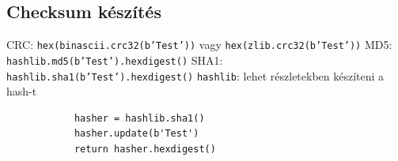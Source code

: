 \documentclass[12pt,a4paper]{article}
\begin{document}
\pagebreak

\subsection{Checksum készítés}

\begin{outline}
	\1 CRC: \texttt{hex(binascii.crc32(b'Test'))} vagy \texttt{hex(zlib.crc32(b'Test'))}
	\1 MD5: \texttt{hashlib.md5(b'Test').hexdigest()}
	\1 SHA1: \texttt{hashlib.sha1(b'Test').hexdigest()}
	\1 \texttt{hashlib}: lehet részletekben készíteni a hash-t
		\2 \begin{verbatim}
			hasher = hashlib.sha1()
			hasher.update(b'Test')
			return hasher.hexdigest()
		\end{verbatim}
\end{outline}
\end{document}
